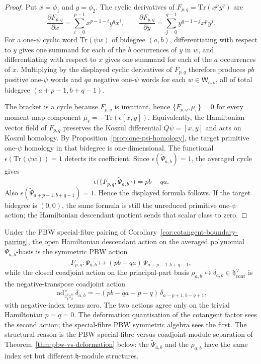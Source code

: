 \documentclass[11pt]{memoir}
\begin{document}
\begin{proof}
  Put $x=\phi_1$ and $y=\phi_2$. The cyclic derivatives of
  $F_{p,q}=\mathrm{Tr}(x^p y^q)$ are
  $$\frac{\partial F_{p,q}}{\partial x}
    =\sum_{i=0}^{p-1}x^{p-1-i}y^qx^i,\qquad
    \frac{\partial F_{p,q}}{\partial y}
    =\sum_{j=0}^{q-1}y^{q-1-j}x^py^j.$$
  For a one-$\psi$ cyclic word $\mathrm{Tr}(\psi w)$ of bidegree $(a,b)$,
  differentiating with respect to $y$ gives one summand for each of the $b$
  occurrences of $y$ in $w$, and differentiating with respect to $x$ gives one
  summand for each of the $a$ occurrences of $x$. Multiplying by the displayed
  cyclic derivatives of $F_{p,q}$ therefore produces $pb$ positive one-$\psi$
  words and $qa$ negative one-$\psi$ words for each $w\in\mathsf W_{a,b}$, all
  of total bidegree $(a+p-1,b+q-1)$.

  The bracket is a cycle because $F_{p,q}$ is invariant, hence
  $\{F_{p,q},\mu_\epsilon\}=0$ for every moment-map component
  $\mu_\epsilon=-\mathrm{Tr}(\epsilon[x,y])$. Equivalently, the Hamiltonian
  vector field of $F_{p,q}$ preserves the Koszul differential
  $Q\psi=[x,y]$ and acts on Koszul homology. By
  Proposition~\ref{prop:one-psi-homology}, the target primitive one-$\psi$
  homology in that bidegree is one-dimensional. The functional
  $\epsilon(\mathrm{Tr}(\psi w))=1$ detects its coefficient. Since
  $\epsilon(\widetilde\Psi_{a,b})=1$, the averaged cycle gives
  $$\epsilon\bigl(\{F_{p,q},\widetilde\Psi_{a,b}\}\bigr)=pb-qa.$$
  Also $\epsilon(\widetilde\Psi_{a+p-1,b+q-1})=1$. Hence the displayed formula
  follows. If the target bidegree is $(0,0)$, the same formula is still the
  unreduced primitive one-$\psi$ action; the Hamiltonian descendant quotient
  sends that scalar class to zero.
\end{proof}

\begin{cor}\label{cor:descendant-coadjoint-difference}
  Under the PBW special-fibre pairing of
  Corollary~\ref{cor:cotangent-boundary-pairing}, the open Hamiltonian
  descendant action on the averaged polynomial
  \(\widetilde\Psi_{a,b}\)-basis is the symmetric PBW action
  $$F_{p,q}:\widetilde\Psi_{a,b}\longmapsto
    (pb-qa)\,\widetilde\Psi_{a+p-1,b+q-1},$$
  while the closed coadjoint action on the principal-part basis
  $\rho_{a,b}\leftrightarrow\delta_{a,b}\in\mathfrak h^\vee_{\mathrm{cont}}$
  is the negative-transpose coadjoint action
  $$\operatorname{ad}^{\vee}_{z_1^pz_2^q}\delta_{a,b}
    =-(pb-qa+p-q)\,\delta_{a-p+1,b-q+1},$$
  with negative-index terms zero. The two actions agree only on the
  trivial Hamiltonian $p=q=0$. The deformation quantisation of the
  cotangent factor sees the second action; the special-fibre PBW
  symmetric algebra sees the first. The structural reason is the PBW
  special-fibre versus coadjoint-module separation of
  Theorem~\ref{thm:pbw-vs-deformation} below: the
  $\widetilde\Psi_{a,b}$ and the $\rho_{a,b}$ have the same index set
  but different $\mathfrak h$-module structures.
\end{cor}
\end{document}
